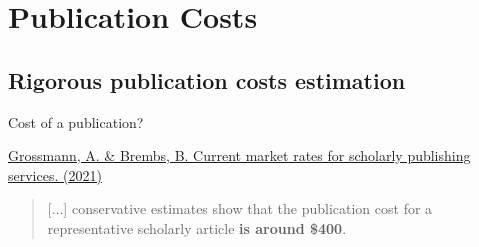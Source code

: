 \documentclass[10pt,compress,serif,aspectratio=169]{beamer}
\begin{document}
\section{Publication Costs}
\subsection{Rigorous publication costs estimation}
\begin{frame}[t]{Cost of a publication?}

\href{https://doi.org/10.12688/f1000research.27468.2}{Grossmann, A. \& Brembs, B. Current market rates for scholarly publishing services. (2021)} 
\begin{quote}
  \vspace{.5cm}
   [...] conservative estimates show that the publication cost for a representative scholarly article \textbf{is around \$400}.
 \end{quote}

 \pause
 \vfill
{}
\end{frame}

\end{document}
